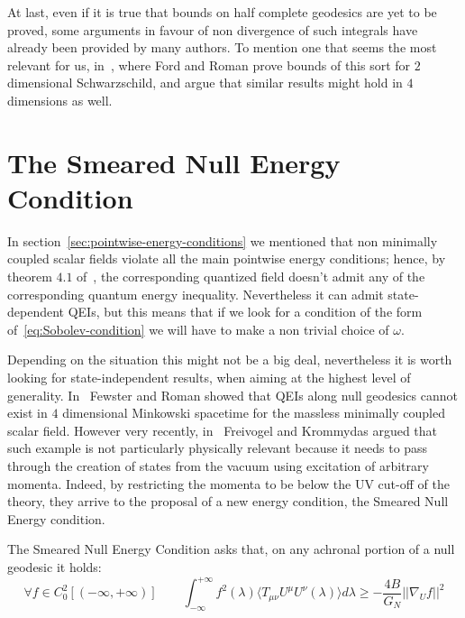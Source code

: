 At last, even if it is true that bounds on half complete geodesics are yet to be proved, some arguments in favour of non divergence of such integrals have already been provided by many authors. To mention one that seems the most relevant for us, in~\cite[]{ford1996averaged}, where Ford and Roman prove bounds of this sort for \(2\) dimensional Schwarzschild, and argue that similar results might hold in \(4\) dimensions as well.

\section{The Smeared Null Energy Condition}
\label{sec:SNEC}

In section~\ref{sec:pointwise-energy-conditions} we mentioned that non minimally coupled scalar fields violate all the main pointwise energy conditions; hence, by theorem \(4.1\) of~\cite[]{kontou2020energy}, the corresponding quantized field doesn't admit any of the corresponding quantum energy inequality. Nevertheless it can admit state-dependent QEIs, but this means that if we look for a condition of the form of~\eqref{eq:Sobolev-condition} we will have to make a non trivial choice of \(\omega\).

Depending on the situation this might not be a big deal, nevertheless it is worth looking for state-independent results, when aiming at the highest level of generality.
In~\cite[]{fewster2003null} Fewster and Roman showed that QEIs along null geodesics cannot exist in \(4\) dimensional Minkowski spacetime for the massless minimally coupled scalar field. However very recently, in~\cite[]{freivogel2018smeared} Freivogel and Krommydas argued that such example is not particularly physically relevant because it needs to pass through the creation of states from the vacuum using excitation of arbitrary momenta. Indeed, by restricting the momenta to be below the UV cut-off of the theory, they arrive to the proposal of a new energy condition, the Smeared Null Energy condition.

\begin{definition}
	The Smeared Null Energy Condition asks that, on any achronal portion of a null geodesic it holds:
	\begin{equation}
		\label{eq:SNEC}
		\forall f \in C_0^2[(-\infty, +\infty)] \quad\quad \int_{-\infty}^{+\infty} f^2(\lambda)\langle T_{\mu\nu}U^{\mu}U^{\nu}(\lambda) \rangle d\lambda \ge -\frac{4B}{G_N}\vert\vert \nabla_U f\vert\vert^2
	\end{equation}
\end{definition}

